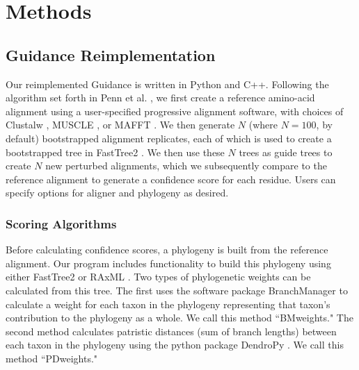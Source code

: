 \documentclass[10pt]{article}
\begin{document}
\section*{Methods}

\subsection*{Guidance Reimplementation}
Our reimplemented Guidance is written in Python and C++. Following the algorithm set forth in Penn et al. \citep{Penn2010}, we first create a reference amino-acid alignment using a user-specified progressive alignment software, with choices of Clustalw \citep{Thompson1994}, MUSCLE \citep{Edgar2004}, or MAFFT \citep{Katoh2002, Katoh2005}. We then generate $N$ (where $N=100$, by default) bootstrapped alignment replicates, each of which is used to create a bootstrapped tree in FastTree2 \citep{Price2010}. We then use these $N$ trees as guide trees to create $N$ new perturbed alignments, which we subsequently compare to the reference alignment to generate a confidence score for each residue. Users can specify options for aligner and phylogeny as desired.

\subsubsection*{Scoring Algorithms}
Before calculating confidence scores, a phylogeny is built from the reference alignment. Our program includes functionality to build this phylogeny using either FastTree2 \citep{Price2010} or RAxML \citep{Stamatakis2006}. Two types of phylogenetic weights can be calculated from this tree. The first uses the software package BranchManager \citep{Stone2007} to calculate a weight for each taxon in the phylogeny representing that taxon's contribution to the phylogeny as a whole. We call this method ``BMweights." The second method calculates patristic distances (sum of branch lengths) between each taxon in the phylogeny using the python package DendroPy \citep{Sukumaran2010}. We call this method ``PDweights."
\end{document}
